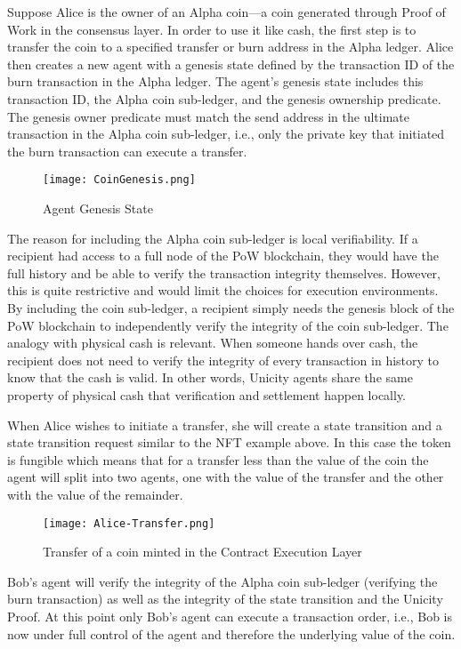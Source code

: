 \documentclass{article}
\begin{document}
Suppose Alice is the owner of an Alpha coin---a coin generated through Proof of Work in the consensus layer. In order to use it like cash, the first step is to transfer the coin to a specified transfer or burn address in the Alpha ledger. Alice then creates a new agent with a genesis state defined by the transaction ID of the burn transaction in the Alpha ledger. The agent's genesis state includes this transaction ID, the Alpha coin sub-ledger, and the genesis ownership predicate. The genesis owner predicate must match the send address in the ultimate transaction in the Alpha coin sub-ledger, i.e., only the private key that initiated the burn transaction can execute a transfer.

\begin{figure}[htbp]
    \centering
    \texttt{[image: CoinGenesis.png]}
    \caption{Agent Genesis State}
    \label{fig:GenesisEvent}
\end{figure}

The reason for including the Alpha coin sub-ledger is local verifiability. If a recipient had access to a full node of the PoW blockchain, they would have the full history and be able to verify the transaction integrity themselves. However, this is quite restrictive and would limit the choices for execution environments. By including the coin sub-ledger, a recipient simply needs the genesis block of the PoW blockchain to independently verify the integrity of the coin sub-ledger. The analogy with physical cash is relevant. When someone hands over cash, the recipient does not need to verify the integrity of every transaction in history to know that the cash is valid. In other words, Unicity agents share the same property of physical cash that verification and settlement happen locally.


When Alice wishes to initiate a transfer, she will create a state transition and a state transition request similar to the NFT example above. In this case the token is fungible which means that for a transfer less than the value of the coin the agent will split into two agents, one with the value of the transfer and the other with the value of the remainder.

\begin{figure}[H]
    \centering
    \texttt{[image: Alice-Transfer.png]}
    \caption{Transfer of a coin minted in the Contract Execution Layer}
    \label{fig:Alice Transfer}
\end{figure}


Bob's agent will verify the integrity of the Alpha coin sub-ledger (verifying the burn transaction) as well as the integrity of the state transition and the Unicity Proof. At this point only Bob's agent can execute a transaction order, i.e., Bob is now under full control of the agent and therefore the underlying value of the coin.
\end{document}
